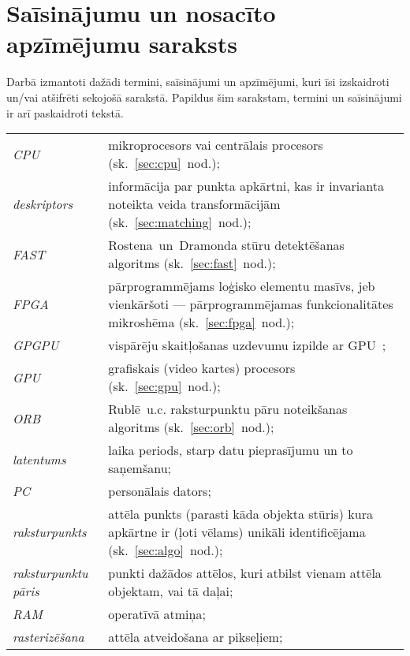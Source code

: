 \section*{Saīsinājumu un nosacīto apzīmējumu saraksts}
Darbā izmantoti dažādi termini, saīsinājumi un apzīmējumi, kuri īsi
izskaidroti un/vai atšifrēti sekojošā sarakstā. Papildus šim sarakstam,
termini un saīsinājumi ir arī paskaidroti tekstā.\\[\parskip]

\noindent%
\begin{tabularx}{\textwidth}{lX}
	\emph{CPU}           & mikroprocesors vai centrālais procesors
	                       (sk.~\ref{sec:cpu}~nod.);\\[1ex]
	\emph{deskriptors}   & informācija par punkta apkārtni, kas ir
	                       invarianta noteikta veida transformācijām
	                       (sk.~\ref{sec:matching}~nod.);\\[1ex]
	\emph{FAST}          & Rostena~un~Dramonda\cite{FAST} stūru detektēšanas
	                       algoritms
	                       (sk.~\ref{sec:fast}~nod.);\\[1ex]
	\emph{FPGA}          & pārprogrammējams loģisko elementu masīvs, jeb
	                       vienkāršoti --- pārprogrammējamas funkcionalitātes
	                       mikroshēma (sk.~\ref{sec:fpga}~nod.);\\[1ex]
	\emph{GPGPU}         & vispārēju skaitļošanas uzdevumu izpilde ar
	                       GPU~\cite{Owens-GPU};\\[1ex]
	\emph{GPU}           & grafiskais (video kartes) procesors
	                       (sk.~\ref{sec:gpu}~nod.);\\[1ex]
	\emph{ORB}           & Rublē~u.c.\cite{ORB} raksturpunktu pāru
	                       noteikšanas algoritms
	                       (sk.~\ref{sec:orb}~nod.);\\[1ex]
	\emph{latentums}     & laika periods, starp datu pieprasījumu un to saņemšanu;\\[1ex]
	\emph{PC}            & personālais dators;\\[1ex]
	\emph{raksturpunkts} & attēla punkts (parasti kāda objekta stūris) kura
	                       apkārtne ir (ļoti vēlams) unikāli identificējama
	                       (sk.~\ref{sec:algo}~nod.);\\[1ex]
	\emph{raksturpunktu pāris} & punkti dažādos attēlos, kuri atbilst vienam
	                            attēla objektam, vai tā daļai;\\[1ex]
	\emph{RAM}           & operatīvā atmiņa;\\[1ex]
	\emph{rasterizēšana} & attēla atveidošana ar pikseļiem;
\end{tabularx}

